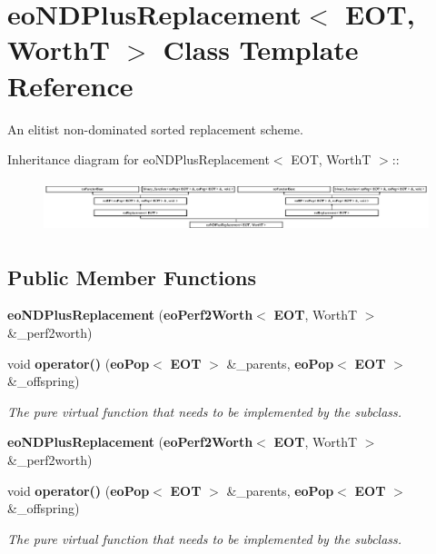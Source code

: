 \section{eo\-NDPlus\-Replacement$<$ EOT, Worth\-T $>$ Class Template Reference}
\label{classeo_n_d_plus_replacement}
An elitist non-dominated sorted replacement scheme.  


Inheritance diagram for eo\-NDPlus\-Replacement$<$ EOT, Worth\-T $>$::\begin{figure}[H]
\begin{center}
\leavevmode
\includegraphics[height=1.50538cm]{classeo_n_d_plus_replacement}
\end{center}
\end{figure}
\subsection*{Public Member Functions}
\begin{CompactItemize}
\item 
{\bf eo\-NDPlus\-Replacement} ({\bf eo\-Perf2Worth}$<$ {\bf EOT}, Worth\-T $>$ \&\_\-perf2worth)\label{classeo_n_d_plus_replacement_a0}

\item 
void {\bf operator()} ({\bf eo\-Pop}$<$ {\bf EOT} $>$ \&\_\-parents, {\bf eo\-Pop}$<$ {\bf EOT} $>$ \&\_\-offspring)\label{classeo_n_d_plus_replacement_a1}

\begin{CompactList}\small\item\em The pure virtual function that needs to be implemented by the subclass. \item\end{CompactList}\item 
{\bf eo\-NDPlus\-Replacement} ({\bf eo\-Perf2Worth}$<$ {\bf EOT}, Worth\-T $>$ \&\_\-perf2worth)\label{classeo_n_d_plus_replacement_a2}

\item 
void {\bf operator()} ({\bf eo\-Pop}$<$ {\bf EOT} $>$ \&\_\-parents, {\bf eo\-Pop}$<$ {\bf EOT} $>$ \&\_\-offspring)\label{classeo_n_d_plus_replacement_a3}

\begin{CompactList}\small\item\em The pure virtual function that needs to be implemented by the subclass. \item\end{CompactList}\end{CompactItemize}
